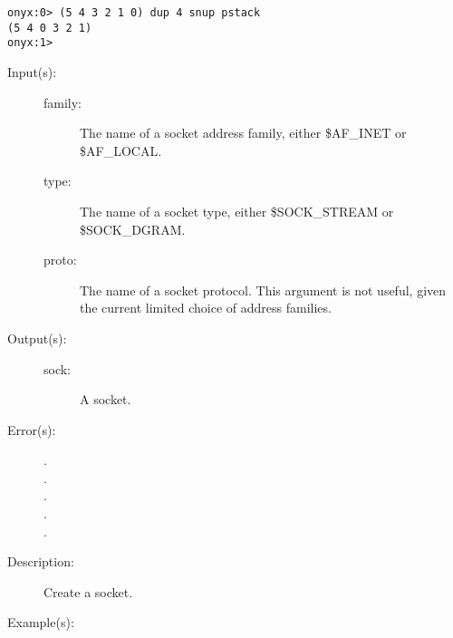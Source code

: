 \begin{description}
\begin{description}
\begin{verbatim}
onyx:0> (5 4 3 2 1 0) dup 4 snup pstack
(5 4 0 3 2 1)
onyx:1>
		\end{verbatim}
	\end{description}
\label{systemdict:socket}
\item[{\onyxop{family type proto}{socket}{sock}}: ]
\item[{\onyxop{family type}{socket}{sock}}: ]
	\begin{description}\item[]
	\item[Input(s): ]
		\begin{description}\item[]
		\item[family: ]
			The name of a socket address family, either \$AF\_INET
			or \$AF\_LOCAL.
		\item[type: ]
			The name of a socket type, either \$SOCK\_STREAM or
			\$SOCK\_DGRAM.
		\item[proto: ]
			The name of a socket protocol.  This argument is not
			useful, given the current limited choice of address
			families.
		\end{description}
	\item[Output(s): ]
		\begin{description}\item[]
		\item[sock: ]
			A socket.
		\end{description}
	\item[Error(s): ]
		\begin{description}\item[]
		\item[.]
		\item[.]
		\item[.]
		\item[.]
		\item[.]
		\end{description}
	\item[Description: ]
		Create a socket.
	\item[Example(s): ]\begin{verbatim}


\end{verbatim}
\end{description}
\end{description}
